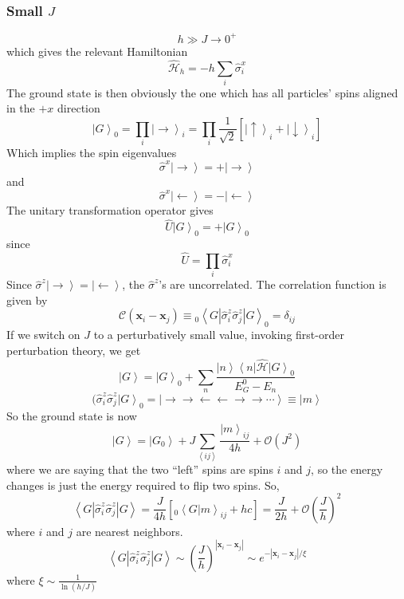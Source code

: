 \documentclass{article}
\begin{document}
	\subsubsection{Small $J$}
	$$h\gg J\rightarrow 0^+$$
	which gives the relevant Hamiltonian
	$$\hat{\mathcal{H}}_h=-h\sum_i\hat{\sigma}_i^x$$
	The ground state is then obviously the one which has all particles' spins aligned in the $+x$ direction
	$$\left|G\right>_0=\prod_i\left|\rightarrow\right>_i=\prod_i\frac{1}{\sqrt{2}}\left[\left|\uparrow\right>_i+\left|\downarrow\right>_i\right]$$
	Which implies the spin eigenvalues
	$$\hat{\sigma}^x\left|\rightarrow\right>=+\left|\rightarrow\right>$$
	and
	$$\hat{\sigma}^x\left|\leftarrow\right>=-\left|\leftarrow\right>$$
	The unitary transformation operator gives 
	$$\hat{U}\left|G\right>_0=+\left|G\right>_0$$
	since
	$$\hat{U}=\prod_i\hat{\sigma}_i^x$$
	Since $\hat{\sigma}^z\left|\rightarrow\right>=\left|\leftarrow\right>$, the $\hat{\sigma}^z$'s are uncorrelated. The correlation function is given by
	$$\mathcal{C}(\mathbf{x}_i-\mathbf{x}_j)\equiv {_0\left<G\left|\hat{\sigma}_i^z\hat{\sigma}_j^z\right|G\right>_0}=\delta_{ij}$$
	If we switch on $J$ to a perturbatively small value, invoking first-order perturbation theory, we get
	$$\left|G\right>=\left|G\right>_0+\sum_n\frac{\left|n\right>\left<n\right|\hat{\mathcal{H}}\left|G\right>_0}{E_G^0-E_n}$$
	$$(\hat{\sigma}_i^z\hat{\sigma}_j^z\left|G\right>_0=\left|\rightarrow\rightarrow\leftarrow\leftarrow\rightarrow\rightarrow\cdots\right>\equiv\left|m\right>$$
	So the ground state is now
	$$\left|G\right>=\left|G_0\right>+J\sum_{\left<ij\right>}\frac{\left|m\right>_{ij}}{4h}+\mathcal{O}(J^2)$$
	where we are saying that the two ``left'' spins are spins $i$ and $j$, so the energy changes is just the energy required to flip two spins.
	So,
	$$\left<G\left|\hat{\sigma}_i^z\hat{\sigma}_j^z\right|G\right>=\frac{J}{4h}\left[{_0\left<G|m\right>_{ij}}+hc\right]=\frac{J}{2h}+\mathcal{O}\left(\frac{J}{h}\right)^2$$
	where $i$ and $j$ are nearest neighbors.
	$$\left<G\left|\hat{\sigma}_i^z\hat{\sigma}_j^z\right|G\right>\sim\left(\frac{J}{h}\right)^{\left|\mathbf{x}_i-\mathbf{x}_j\right|}\sim e^{-\left|\mathbf{x}_i-\mathbf{x}_j\right|/\xi}$$
	where $\xi\sim\frac{1}{\ln(h/J)}$
\end{document}
